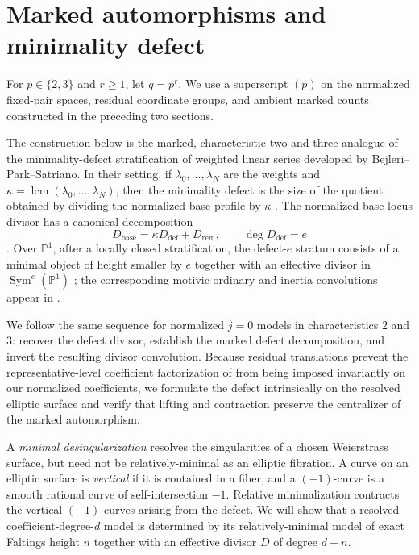 \documentclass[a4paper,12pt]{amsart}
\theoremstyle{definition}
\newcommand{\Pb}{\mathbb{P}}
\newcommand{\Sym}{\operatorname{Sym}}
\begin{document}
\section{Marked automorphisms and minimality defect}
\label{sec:defect}

For $p\in\{2,3\}$ and $r\geq1$, let $q=p^r$.  We use a superscript $(p)$ on the normalized fixed-pair spaces, residual coordinate groups, and ambient marked counts constructed in the preceding two sections.

The construction below is the marked, characteristic-two-and-three analogue of the minimality-defect stratification of weighted linear series developed by Bejleri--Park--Satriano.  In their setting, if $\lambda_0,\ldots,\lambda_N$ are the weights and $\kappa=\operatorname{lcm}(\lambda_0,\ldots,\lambda_N)$, then the minimality defect is the size of the quotient obtained by dividing the normalized base profile by $\kappa$ \cite[Definition~4.31]{BPS}.  The normalized base-locus divisor has a canonical decomposition
\[
D_{\mathrm{base}}=\kappa D_{\mathrm{def}}+D_{\mathrm{rem}},
\qquad
\deg D_{\mathrm{def}}=e
\]
\cite[Lemma~4.32]{BPS}.  Over $\Pb^1$, after a locally closed stratification, the defect-$e$ stratum consists of a minimal object of height smaller by $e$ together with an effective divisor in $\Sym^e(\Pb^1)$ \cite[Proposition~6.1 and Corollary~6.2]{BPS}; the corresponding motivic ordinary and inertia convolutions appear in \cite[Lemma~8.6, equations~(6)--(7)]{BPS}.

We follow the same sequence for normalized $j=0$ models in characteristics $2$ and $3$: recover the defect divisor, establish the marked defect decomposition, and invert the resulting divisor convolution.  Because residual translations prevent the representative-level coefficient factorization of \cite[Section~6.1]{BPS} from being imposed invariantly on our normalized coefficients, we formulate the defect intrinsically on the resolved elliptic surface and verify that lifting and contraction preserve the centralizer of the marked automorphism.

A \emph{minimal desingularization} resolves the singularities of a chosen Weierstrass surface, but need not be relatively-minimal as an elliptic fibration.  A curve on an elliptic surface is \emph{vertical} if it is contained in a fiber, and a $(-1)$-curve is a smooth rational curve of self-intersection $-1$.  Relative minimalization contracts the vertical $(-1)$-curves arising from the defect.  We will show that a resolved coefficient-degree-$d$ model is determined by its relatively-minimal model of exact Faltings height $n$ together with an effective divisor $D$ of degree $d-n$.
\end{document}
